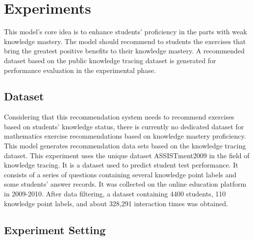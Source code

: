 \section{Experiments}

This model's core idea is to enhance students' proficiency in the parts with weak knowledge mastery. The model should recommend to students the exercises that bring the greatest positive benefits to their knowledge mastery. A recommended dataset based on the public knowledge tracing dataset is generated for performance evaluation in the experimental phase.
\subsection{Dataset}

Considering that this recommendation system needs to recommend exercises based on students' knowledge status, there is currently no dedicated dataset for mathematics exercise recommendations based on knowledge mastery proficiency. This model generates recommendation data sets based on the knowledge tracing dataset. This experiment uses the unique dataset ASSISTment2009 in the field of knowledge tracing. It is a dataset used to predict student test performance. It consists of a series of questions containing several knowledge point labels and some students' answer records. It was collected on the online education platform in 2009-2010. After data filtering, a dataset containing 4400 students, 110 knowledge point labels, and about 328,291 interaction times was obtained.

\subsection{Experiment Setting}

